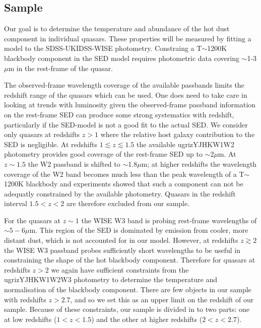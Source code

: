\subsection{Sample}

Our goal is to determine the temperature and abundance of the hot dust component in individual quasars.  
These properties will be measured by fitting a model to the SDSS-UKIDSS-WISE photometry. 
Constraing a T$\sim$1200K blackbody component in the SED model requires photometric data covering $\sim$1-3$\mu$m in the rest-frame of the quasar. 

The observed-frame wavelength coverage of the available passbands limits the redshift range of the quasars which can be used. 
One does need to take care in looking at trends with luminosity given the observed-frame passband information on the rest-frame SED can produce some strong systematics with redshift, particularly if the SED-model is not a good fit to the actual SED. 
We consider only quasars at redshifts $z>1$ where the relative host galaxy contribution to the SED is negligible. 
At redshifts $1 \lesssim z \lesssim 1.5$ the available ugrizYJHKW1W2 photometry provides good coverage of the rest-frame SED up to $\sim$2$\mu$m.
At $z\sim1.5$ the W2 passband is shifted to $\sim$1.8$\mu$m; at higher redshifts the wavelength coverage of the W2 band becomes much less than the peak wavelength of a T$\sim$1200K blackbody and experiments showed that such a component can not be adequatly constrained by the available photometry. 
Quasars in the redshift interval $1.5 < z < 2$ are therefore excluded from our sample. 

For the quasars at $z \sim 1$ the WISE W3 band is probing rest-frame wavelengths of $\sim5-6\mu$m. 
This region of the SED is dominated by emission from cooler, more distant dust, which is not accounted for in our model.
However, at redshifts $z \gtrsim 2$ the WISE W3 passband probes sufficiently short wavelengths to be useful in constraining the shape of the hot blackbody component. 
Therefore for quasars at redshifts $z > 2$ we again have sufficient constraints from the ugrizYJHKW1W2W3 photometry to determine the temperature and normalisation of the blackbody component. 
There are few objects in our sample with redshifts $z > 2.7$, and so we set this as an upper limit on the redshift of our sample. 
Because of these constraints, our sample is divided in to two parts: one at low redshifts ($1 < z < 1.5$) and the other at higher redshifts ($2 < z < 2.7$). 

